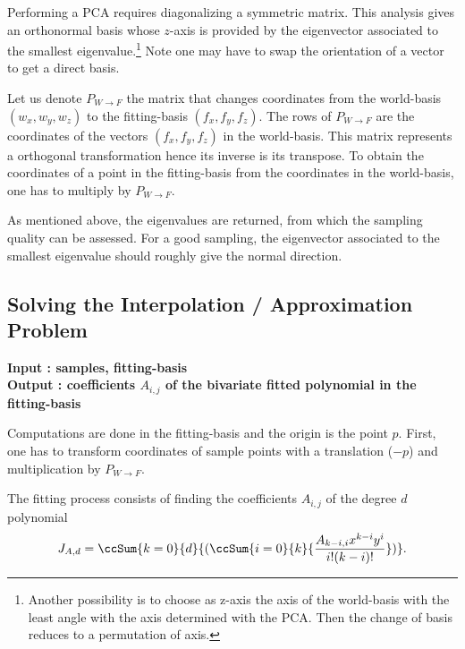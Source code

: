 \begin{ccAdvanced}
%
%
Performing a PCA requires diagonalizing a symmetric matrix.  This
analysis gives an orthonormal basis whose $z$-axis is provided by the
eigenvector associated to the smallest eigenvalue.\footnote{Another
  possibility is to choose as z-axis the axis of the world-basis with
  the least angle with the axis determined with the PCA. Then the
  change of basis reduces to a permutation of axis.} Note one may have
to swap the orientation of a vector to get a direct basis.

Let us denote $P_{W\rightarrow F}$ the matrix that changes coordinates from the
world-basis $(w_x,w_y,w_z)$ to the fitting-basis $(f_x,f_y,f_z)$. The
rows of $P_{W\rightarrow F}$ are the coordinates of the vectors
$(f_x,f_y,f_z)$ in the world-basis. This matrix represents a
orthogonal transformation hence its inverse is its transpose. To obtain
the coordinates of a point in the fitting-basis from the coordinates
in the world-basis, one has to multiply by $ P_{W\rightarrow F}$.

As mentioned above, the eigenvalues are returned, from which the
sampling quality can be assessed. For a good sampling, the eigenvector
associated to the smallest eigenvalue should roughly give the normal
direction.

\subsection{Solving the Interpolation / Approximation Problem\label{sec:solving}}

{\bf Input : samples, fitting-basis \\ Output : coefficients $A_{i,j}$
of the bivariate fitted polynomial in the fitting-basis }

Computations are done in the fitting-basis and the origin is the point
$p$. First, one has to transform coordinates of sample points with a
translation ($-p$) and multiplication by $ P_{W\rightarrow F}$.

The fitting process consists of finding the coefficients
$A_{i,j}$ of the degree $d$ polynomial 
\begin{equation}
\label{eq-answer}
J_{A,d}= \ccSum{k=0}{d}{(\ccSum{i=0}{k}{
\frac{A_{k-i,i}x^{k-i}y^{i}}{i!(k-i)!}})}.
\end{equation}



\end{ccAdvanced}
